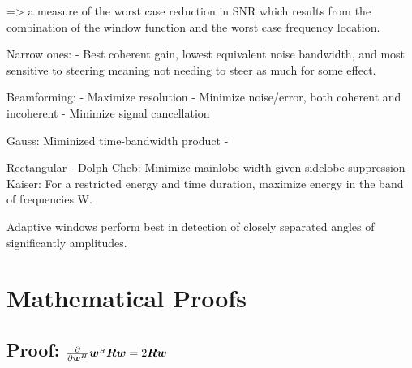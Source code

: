 => a measure of the worst case reduction in SNR which results from the combination of the window function and the worst case frequency location.


Narrow ones:
- Best coherent gain, lowest equivalent noise bandwidth, and most sensitive to steering meaning not needing to steer as much for some effect.


Beamforming:
- Maximize resolution
- Minimize noise/error, both coherent and incoherent
- Minimize signal cancellation

Gauss: Miminized time-bandwidth product
  - 
  
Rectangular
  - 
Dolph-Cheb: Minimize mainlobe width given sidelobe suppression
Kaiser: For a restricted energy and time duration, maximize energy in the band of frequencies W.

Adaptive windows perform best in detection of closely separated angles of significantly amplitudes.


\section{Mathematical Proofs}

\subsection[Proof d/dw\^{}H w\^{}HRw = 2Rw]{Proof: $\frac{\partial}{\partial\boldsymbol{w}^{\scriptscriptstyle H}} \boldsymbol{w}^{\scriptscriptstyle H}\boldsymbol{R}\boldsymbol{w} = 2\boldsymbol{R}\boldsymbol{w}$}

